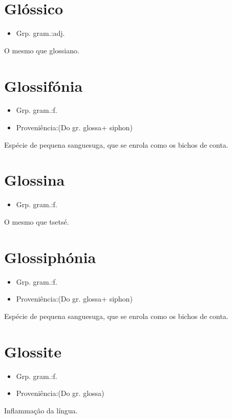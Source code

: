 \section{Glóssico}
\begin{itemize}
\item {Grp. gram.:adj.}
\end{itemize}
O mesmo que \textunderscore glossiano\textunderscore .
\section{Glossifónia}
\begin{itemize}
\item {Grp. gram.:f.}
\end{itemize}
\begin{itemize}
\item {Proveniência:(Do gr. \textunderscore glossa\textunderscore  + \textunderscore siphon\textunderscore )}
\end{itemize}
Espécie de pequena sanguesuga, que se enrola como os bichos de conta.
\section{Glossina}
\begin{itemize}
\item {Grp. gram.:f.}
\end{itemize}
O mesmo que \textunderscore tsetsé\textunderscore .
\section{Glossiphónia}
\begin{itemize}
\item {Grp. gram.:f.}
\end{itemize}
\begin{itemize}
\item {Proveniência:(Do gr. \textunderscore glossa\textunderscore  + \textunderscore siphon\textunderscore )}
\end{itemize}
Espécie de pequena sanguesuga, que se enrola como os bichos de conta.
\section{Glossite}
\begin{itemize}
\item {Grp. gram.:f.}
\end{itemize}
\begin{itemize}
\item {Proveniência:(Do gr. \textunderscore glossa\textunderscore )}
\end{itemize}
Inflammação da língua.
